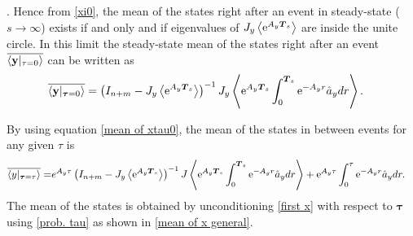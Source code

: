 \documentclass[letterpaper, 10 pt,one column, conference]{ieeeconf}  %
\begin{document}
\cite{oks03}. Hence from \eqref{xi0}, the mean of the states right after an event in steady-state ($s\rightarrow \infty$) exists if and only and if eigenvalues of $J_y \left\langle  {\rm e}^{ A_y \boldsymbol T_s} \right \rangle$ are inside the unite circle. In this limit the steady-state mean of the states right after an event $\overline{\langle \bold y \vert_{\tau=0}\rangle }$ can be written as
\begin{equation}
\begin{aligned}
& \overline{\langle \bold y \vert_{\boldsymbol\tau=0}\rangle } =  \left(I_{n+m} -J_y \left\langle {\rm e}^{ A_y \boldsymbol T_s} \right \rangle   \right)^{-1}J_y \left \langle  {\rm e}^{ A_y \boldsymbol T_s} \int_0^{\boldsymbol T_s}  {\rm e}^{ -A_y r} \hat{a}_y  dr  \right \rangle  .
\end{aligned}
\label{mean of xtau0}	
\end{equation} 


By using equation \eqref{mean of xtau0}, the mean of the states in between events for any given $\tau$ is  
\begin{equation}
\begin{aligned}
\overline{\langle y \vert_{\boldsymbol\tau=\tau }\rangle } = & e^{A_y\tau } \left(I_{n+m} -J_y \left\langle {\rm e}^{ A_y \boldsymbol T_s} \right \rangle   \right)^{-1} J\left \langle  {\rm e}^{ A_y\boldsymbol T_s} \int_0^{\boldsymbol T_s}  {\rm e}^{ -A_yr} \hat{a}_y dr  \right \rangle   +  {\rm e}^{ A_y \tau  } \int_0^\tau   {\rm e}^{ -A_yr} \hat{a}_y dr  .
\label{first x}
\end{aligned}
\end{equation}
The mean of the states is obtained by unconditioning \eqref{first x} with respect to $\boldsymbol \tau$ using \eqref{prob. tau} as shown in \eqref{mean of x general}.
\end{document}
